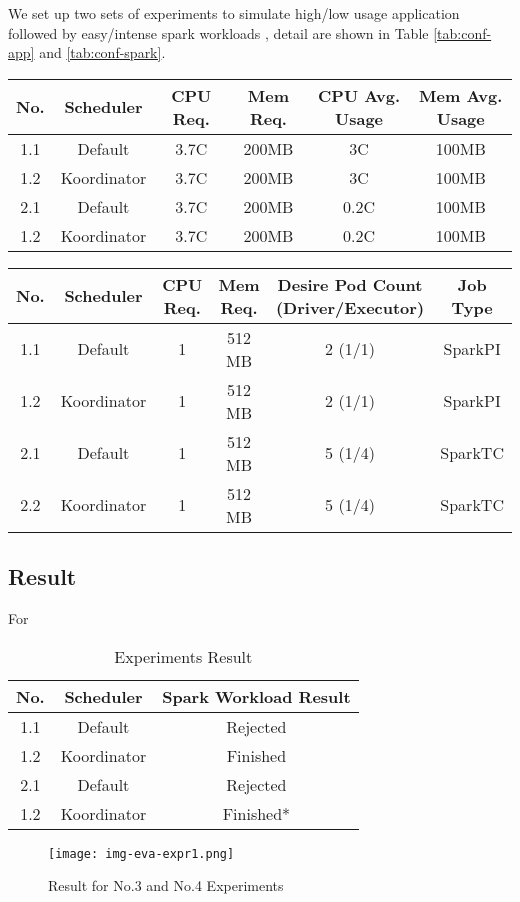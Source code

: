 We set up two sets of experiments to simulate high/low usage application followed by easy/intense spark workloads , detail are shown in Table \ref{tab:conf-app} and \ref{tab:conf-spark}.

\begin{table*}[h]
	\centering
	\begin{tabular}{cccccc}
		No. & Scheduler   & CPU Req. & Mem Req. & CPU Avg. Usage & Mem Avg. Usage \\
		\hline
		1.1   & Default     & 3.7C     & 200MB    & 3C             & 100MB          \\
		1.2   & Koordinator & 3.7C     & 200MB    & 3C             & 100MB          \\
		2.1   & Default     & 3.7C     & 200MB    & 0.2C           & 100MB          \\
		1.2   & Koordinator & 3.7C     & 200MB    & 0.2C           & 100MB
	\end{tabular}
	\caption{Application Workload Configuration}
	\label{tab:conf-app}

\end{table*}

\begin{table*}[h]
	\centering
	\begin{tabular}{cccccc}
		No. & Scheduler   & CPU Req. & Mem Req. & Desire Pod Count (Driver/Executor) & Job Type \\
		\hline
		1.1 & Default     & 1        & 512 MB   & 2 (1/1)                            & SparkPI  \\
		1.2 & Koordinator & 1        & 512 MB   & 2 (1/1)                            & SparkPI  \\
		2.1 & Default     & 1        & 512 MB   & 5 (1/4)                            & SparkTC  \\
		2.2 & Koordinator & 1        & 512 MB   & 5 (1/4)                            & SparkTC
	\end{tabular}
	\caption{Spark Workload Configuration}
	\label{tab:conf-spark}
\end{table*}

\subsection{Result}

For

\begin{table}[h]
	\centering
	\begin{tabular}{ccc}
		No. & Scheduler   & Spark Workload Result \\
		\hline
		1.1   & Default     & Rejected              \\
		1.2   & Koordinator & Finished              \\
		2.1   & Default     & Rejected              \\
		1.2   & Koordinator & Finished*
	\end{tabular}
	\caption{Experiments Result}
	\label{tab:res}
\end{table}

\begin{figure}[h]
	\centering
	\texttt{[image: img-eva-expr1.png]}
	\caption{Result for No.3 and No.4 Experiments}
	\label{fig:res-1}
\end{figure}
